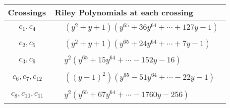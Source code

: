 \documentclass[1p]{elsarticle_modified}
\theoremstyle{definition}
\begin{document}
\begin{tabular}{m{50pt}|m{274pt}}
Crossings & \hspace{64pt}Riley Polynomials at each crossing \\
\hline $$\begin{aligned}c_{1},c_{4}\end{aligned}$$&$\begin{aligned}
&(y^2+y+1)(y^{65}+36 y^{64}+\cdots+127 y-1)
\end{aligned}$\\
\hline $$\begin{aligned}c_{2},c_{5}\end{aligned}$$&$\begin{aligned}
&(y^2+y+1)(y^{65}+24 y^{64}+\cdots+7 y-1)
\end{aligned}$\\
\hline $$\begin{aligned}c_{3},c_{9}\end{aligned}$$&$\begin{aligned}
&y^2(y^{65}+15 y^{64}+\cdots-152 y-16)
\end{aligned}$\\
\hline $$\begin{aligned}c_{6},c_{7},c_{12}\end{aligned}$$&$\begin{aligned}
&((y-1)^2)(y^{65}-51 y^{64}+\cdots-22 y-1)
\end{aligned}$\\
\hline $$\begin{aligned}c_{8},c_{10},c_{11}\end{aligned}$$&$\begin{aligned}
&y^2(y^{65}+67 y^{64}+\cdots-1760 y-256)
\end{aligned}$\\
\hline
\end{tabular}
\vskip 2pc
\end{document}
